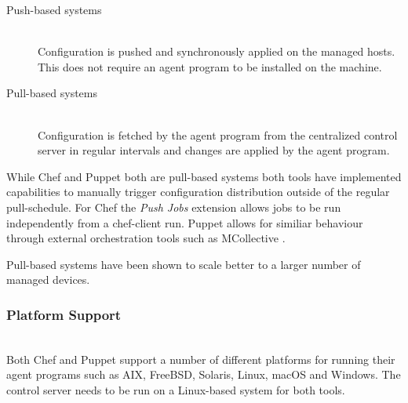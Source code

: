 \begin{description}
	
	\item[Push-based systems] \hfill \\ 
	Configuration is pushed and synchronously applied on the managed hosts. This does not require an agent program to be installed on the machine. 
	
	\item[Pull-based systems] \hfill \\
	Configuration is fetched by the agent program from the centralized control server in regular intervals and changes are applied by the agent program.
	
\end{description}

While Chef and Puppet both are pull-based systems both tools have implemented capabilities to manually trigger configuration distribution outside of the regular pull-schedule. For Chef the \textit{Push Jobs} extension allows jobs to be run independently from a chef-client run. Puppet allows for similiar behaviour through external orchestration tools such as MCollective \cite{mcollective}.

Pull-based systems have been shown to scale better to a larger number of managed devices.

\subsubsection{Platform Support}\hfill\\

Both Chef and Puppet support a number of different platforms for running their agent programs such as AIX, FreeBSD, Solaris, Linux, macOS and Windows. The control server needs to be run on a Linux-based system for both tools.
